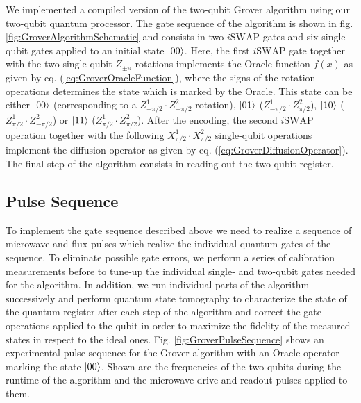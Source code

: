 We implemented a compiled version of the two-qubit Grover algorithm using our two-qubit quantum processor. The gate sequence of the algorithm is shown in fig. \ref{fig:GroverAlgorithmSchematic} and consists in two $i\mathrm{SWAP}$ gates and six single-qubit gates applied to an initial state $\left| 00 \right>$. Here, the first $i\mathrm{SWAP}$ gate together with the two single-qubit $Z_{\pm \pi}$ rotations implements the Oracle function $f(x)$ as given by eq. (\ref{eq:GroverOracleFunction}), where the signs of the rotation operations determines the state which is marked by the Oracle. This state can be either $\left| 00 \right>$ (corresponding to a $Z^1_{-\pi/2}\cdot Z^2_{-\pi/2}$ rotation), $\left| 01 \right>$ ($Z^1_{-\pi/2}\cdot Z^2_{\pi/2}$), $\left| 10 \right>$ ($Z^1_{\pi/2}\cdot Z^2_{-\pi/2}$) or $\left| 11 \right>$ ($Z^1_{\pi/2}\cdot Z^2_{\pi/2}$). After the encoding, the second $i\mathrm{SWAP}$ operation together with the following $X^1_{\pi/2}\cdot X^2_{\pi/2}$ single-qubit operations implement the diffusion operator as given by eq. (\ref{eq:GroverDiffusionOperator}). The final step of the algorithm consists in reading out the two-qubit register.

\subsection{Pulse Sequence}

To implement the gate sequence described above we need to realize a sequence of microwave and flux pulses which realize the individual quantum gates of the sequence. To eliminate possible gate errors, we perform a series of calibration measurements before to tune-up the individual single- and two-qubit gates needed for the algorithm. In addition, we run individual parts of the algorithm successively and perform quantum state tomography to characterize the state of the quantum register after each step of the algorithm and correct the gate operations applied to the qubit in order to maximize the fidelity of the measured states in respect to the ideal ones. Fig. \ref{fig:GroverPulseSequence} shows an experimental pulse sequence for the Grover algorithm with an Oracle operator marking the state $\left| 00 \right>$. Shown are the frequencies of the two qubits during the runtime of the algorithm and the microwave drive and readout pulses applied to them.

